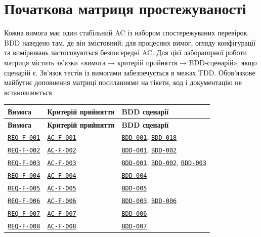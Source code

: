 \documentclass[11pt,a4paper]{article}
\begin{document}
\section{Початкова матриця простежуваності}
Кожна вимога має один стабільний AC із набором спостережуваних перевірок. BDD наведено там, де він змістовний; для процесних вимог, огляду конфігурації та вимірювань застосовуються безпосередні AC. Для цієї лабораторної роботи матриця містить зв’язки «вимога → критерій прийняття → BDD-сценарій», якщо сценарій є. Зв’язок тестів із вимогами забезпечується в межах TDD. Обов’язкове майбутнє доповнення матриці посиланнями на тікети, код і документацію не встановлюється.

\small
\begin{longtable}{p{3.1cm} p{3.0cm} >{\raggedright\arraybackslash}p{9.1cm}}
\toprule \textbf{Вимога} & \textbf{Критерій прийняття} & \textbf{BDD сценарії} \\ \midrule
\endfirsthead
\toprule \textbf{Вимога} & \textbf{Критерій прийняття} & \textbf{BDD сценарії} \\ \midrule
\endhead \bottomrule \endfoot
\hyperlink{REQ-F-001}{\texttt{REQ-F-001}} & \hyperlink{AC-F-001}{\texttt{AC-F-001}} & \hyperlink{BDD-001}{\texttt{BDD-001}}, \hyperlink{BDD-018}{\texttt{BDD-018}} \\
\hyperlink{REQ-F-002}{\texttt{REQ-F-002}} & \hyperlink{AC-F-002}{\texttt{AC-F-002}} & \hyperlink{BDD-001}{\texttt{BDD-001}}, \hyperlink{BDD-002}{\texttt{BDD-002}} \\
\hyperlink{REQ-F-003}{\texttt{REQ-F-003}} & \hyperlink{AC-F-003}{\texttt{AC-F-003}} & \hyperlink{BDD-001}{\texttt{BDD-001}}, \hyperlink{BDD-002}{\texttt{BDD-002}}, \hyperlink{BDD-003}{\texttt{BDD-003}} \\
\hyperlink{REQ-F-004}{\texttt{REQ-F-004}} & \hyperlink{AC-F-004}{\texttt{AC-F-004}} & \hyperlink{BDD-004}{\texttt{BDD-004}} \\
\hyperlink{REQ-F-005}{\texttt{REQ-F-005}} & \hyperlink{AC-F-005}{\texttt{AC-F-005}} & \hyperlink{BDD-005}{\texttt{BDD-005}} \\
\hyperlink{REQ-F-006}{\texttt{REQ-F-006}} & \hyperlink{AC-F-006}{\texttt{AC-F-006}} & \hyperlink{BDD-003}{\texttt{BDD-003}}, \hyperlink{BDD-006}{\texttt{BDD-006}} \\
\hyperlink{REQ-F-007}{\texttt{REQ-F-007}} & \hyperlink{AC-F-007}{\texttt{AC-F-007}} & \hyperlink{BDD-006}{\texttt{BDD-006}} \\
\hyperlink{REQ-F-008}{\texttt{REQ-F-008}} & \hyperlink{AC-F-008}{\texttt{AC-F-008}} & \hyperlink{BDD-007}{\texttt{BDD-007}} \\

\end{longtable}
\end{document}
